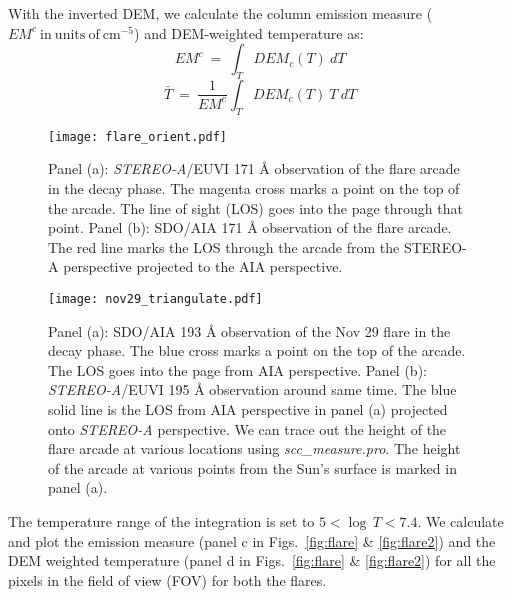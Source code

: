 With the inverted DEM, we calculate the column emission measure ($EM^{c}~\mathrm{in~units~of~cm^{-5}}$) and DEM-weighted temperature as:
\begin{equation}
    EM^{c}~=~\int_{T} DEM_{c}(T)~dT
\end{equation}
\begin{equation}
    \bar{T}~=~\frac{1}{EM^{c}}\int_{T} DEM_{c}(T)~T~dT
\end{equation}

\begin{figure}[ht!]
    \centering
    \texttt{[image: flare\_orient.pdf]}
    \caption{Panel (a): {\it STEREO-A}/EUVI 171 {\AA} observation of the flare arcade in the decay phase. The magenta cross marks a point on the top of the arcade. The line of sight (LOS) goes into the page through that point. Panel (b): SDO/AIA 171 {\AA} observation of the flare arcade. The red line marks the LOS through the arcade from the STEREO-A perspective projected to the AIA perspective.} %
    \label{fig:flare_orient}
\end{figure}
\begin{figure}[ht!]
    \centering
    \texttt{[image: nov29\_triangulate.pdf]}
    \caption{Panel (a): SDO/AIA 193 {\AA} observation of the Nov 29 flare in the decay phase. The blue cross marks a point on the top of the arcade. The LOS goes into the page from AIA perspective. Panel (b): {\it STEREO-A}/EUVI 195 {\AA} observation around same time. The blue solid line is the LOS from AIA perspective in panel (a) projected onto {\it STEREO-A} perspective. We can trace out the height of the flare arcade at various locations using \textit{scc\_measure.pro}. The height of the arcade at various points from the Sun's surface is marked in panel (a).}
    \label{fig:flare_orient2}
    \end{figure}

The temperature range of the integration is set to $5 < \log\,T < 7.4$. We calculate and plot the emission measure (panel c in Figs.~\ref{fig:flare} \& \ref{fig:flare2}) and the DEM weighted temperature (panel d in Figs.~\ref{fig:flare} \& \ref{fig:flare2}) for all the pixels in the field of view (FOV) for both the flares.  


